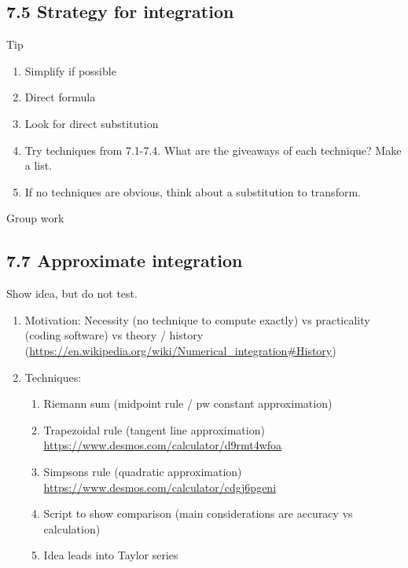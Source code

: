 \documentclass{article}
\begin{document}
\subsection{7.5 Strategy for integration}
Tip
\begin{enumerate}
\item Simplify if possible
\item Direct formula
\item Look for direct substitution
\item Try techniques from 7.1-7.4. What are the giveaways of each technique? Make a list.
\item If no techniques are obvious, think about a substitution to transform. 
\end{enumerate}
Group work


\subsection{7.7 Approximate integration}
Show idea, but do not test. 
\begin{enumerate}
\item Motivation: Necessity (no technique to compute exactly) vs practicality (coding software) vs theory / history (\url{https://en.wikipedia.org/wiki/Numerical_integration#History})
\item Techniques:
\begin{enumerate}
\item Riemann sum (midpoint rule / pw constant approximation)
\item Trapezoidal rule (tangent line approximation) \url{https://www.desmos.com/calculator/d9rmt4wfoa}
\item Simpsons rule (quadratic approximation) \url{https://www.desmos.com/calculator/cdgj6pgeni}
\item Script to show comparison (main considerations are accuracy vs calculation)
\item Idea leads into Taylor series
\end{enumerate}
\end{enumerate}

\end{document}

